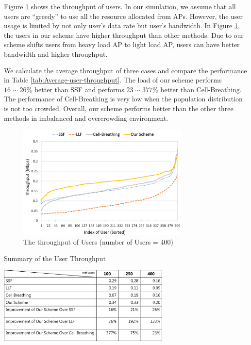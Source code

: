 Figure \ref{fig:Average-user-throughput} shows the throughput of users. In our simulation, we assume that all users are “greedy” to use all the resource allocated from APs. However, the user usage is limited by not only user’s data rate but user’s bandwidth. In Figure \ref{fig:Average-user-throughput}, the users in our scheme have higher throughput than other methods. Due to our scheme shifts users from heavy load AP to light load AP, users can have better bandwidth and higher throughput.

We calculate the average throughput of three cases and compare the performance in Table \ref{tab:Average-user-throughput}. The load of our scheme performs $16\sim26\%$ better than SSF and performs $23\sim377\%$ better than Cell-Breathing. The performance of Cell-Breathing is very low when the population distribution is not too crowded. Overall, our scheme performs better than the other three methods in imbalanced and overcrowding environment.

\begin{figure}[tbp]
\begin{center}
\includegraphics[width=3.4in]{images/Average_user_throughput.png}
\end{center}
\caption{The throughput of Users (number of Users = 400)}
\label{fig:Average-user-throughput}
\end{figure}

\begin{table}[tbp]
\setlength{\belowcaptionskip}{15pt}
\centering
\caption{Summary of the User Throughput}
\label{tab:Average-user-throughput}
\includegraphics[width=3.4in]{images/table4_4.png}
\end{table}

